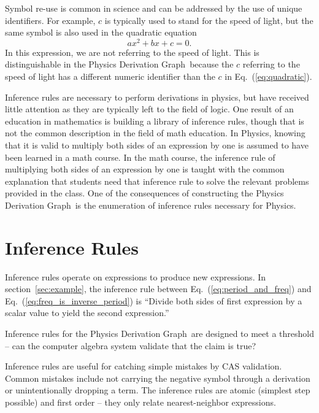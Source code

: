 \documentclass{article}
\newcommand{\eqn}[1]{Eq.\ (\ref{#1})}
\newcommand{\pdg}{Physics Derivation Graph}
\begin{document}
\begin{multicols}{2}
Symbol re-use is common in science and can be addressed by the use of unique identifiers. For example, $c$ is typically used to stand for the speed of light, but the same symbol is also used in the quadratic equation
\begin{equation}
a x^2+b x+c =0.
\label{eq:quadratic}
\end{equation}
In this expression, we are not referring to the speed of light. This is distinguishable in the \pdg\ because the $c$ referring to the speed of light has a different numeric identifier than the $c$ in \eqn{eq:quadratic}. 

Inference rules are necessary to perform derivations in physics, but have received little attention as they are typically left to the field of logic. One result of an education in mathematics is building a library of inference rules, though that is not the common description in the field of math education. In Physics, knowing that it is valid to multiply both sides of an expression by one is assumed to have been learned in a math course. In the math course, the inference rule of multiplying both sides of an expression by one is taught with the common explanation that students need that inference rule to solve the relevant problems provided in the class. 
One of the consequences of constructing the \pdg\ is the enumeration of inference rules necessary for Physics. 

\section{Inference Rules\label{sec:inference_rules}}

Inference rules operate on expressions to produce new expressions. In section~\ref{sec:example}, the inference rule between \eqn{eq:period_and_freq} and \eqn{eq:freq_is_inverse_period} is ``Divide both sides of first expression by a scalar value to yield the second expression.''

Inference rules for the \pdg\ are designed to meet a threshold -- can the computer algebra system validate that the claim is true?

Inference rules are useful for catching simple mistakes by CAS validation. Common mistakes include not carrying the negative symbol through a derivation or unintentionally dropping a term. The inference rules are atomic (simplest step possible) and first order -- they only relate nearest-neighbor expressions.


\end{multicols}
\end{document}
